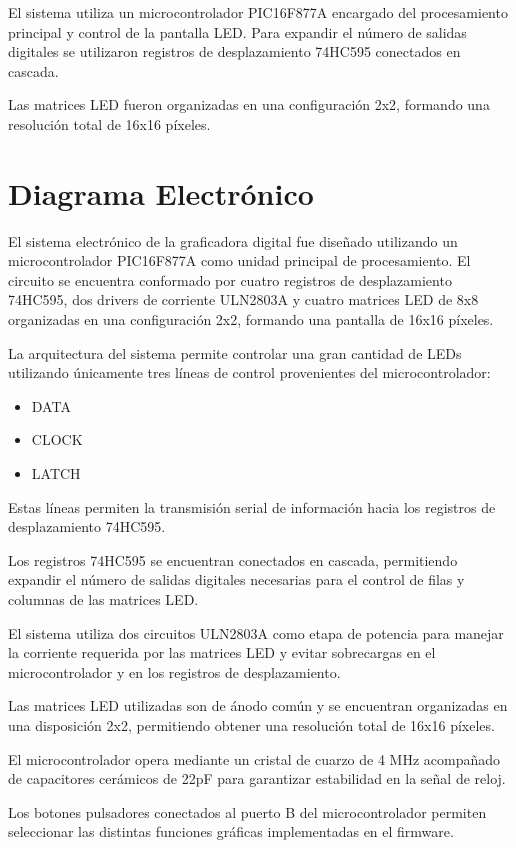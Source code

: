 El sistema utiliza un microcontrolador PIC16F877A encargado del procesamiento principal y control de la pantalla LED. Para expandir el número de salidas digitales se utilizaron registros de desplazamiento 74HC595 conectados en cascada.

Las matrices LED fueron organizadas en una configuración 2x2, formando una resolución total de 16x16 píxeles.


 \section{Diagrama Electrónico}

El sistema electrónico de la graficadora digital fue diseñado utilizando un microcontrolador PIC16F877A como unidad principal de procesamiento. El circuito se encuentra conformado por cuatro registros de desplazamiento 74HC595, dos drivers de corriente ULN2803A y cuatro matrices LED de 8x8 organizadas en una configuración 2x2, formando una pantalla de 16x16 píxeles.

La arquitectura del sistema permite controlar una gran cantidad de LEDs utilizando únicamente tres líneas de control provenientes del microcontrolador:

\begin{itemize}
    \item DATA
    \item CLOCK
    \item LATCH
\end{itemize}

Estas líneas permiten la transmisión serial de información hacia los registros de desplazamiento 74HC595.

Los registros 74HC595 se encuentran conectados en cascada, permitiendo expandir el número de salidas digitales necesarias para el control de filas y columnas de las matrices LED.

El sistema utiliza dos circuitos ULN2803A como etapa de potencia para manejar la corriente requerida por las matrices LED y evitar sobrecargas en el microcontrolador y en los registros de desplazamiento.

Las matrices LED utilizadas son de ánodo común y se encuentran organizadas en una disposición 2x2, permitiendo obtener una resolución total de 16x16 píxeles.

El microcontrolador opera mediante un cristal de cuarzo de 4 MHz acompañado de capacitores cerámicos de 22pF para garantizar estabilidad en la señal de reloj.

Los botones pulsadores conectados al puerto B del microcontrolador permiten seleccionar las distintas funciones gráficas implementadas en el firmware.

